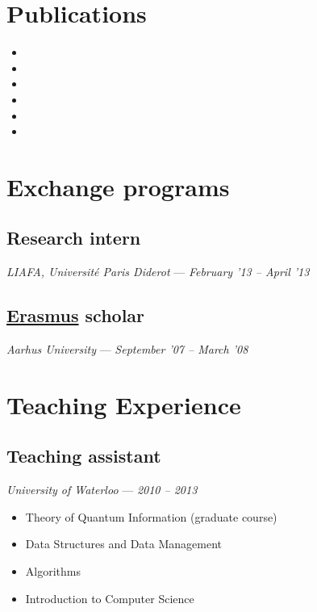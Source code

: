 \documentclass[]{article}
\begin{document}


\section{Publications}\label{publications}

\begin{itemize}
  \item {}
  \item {}
  \item {}
  \item {}
  \item {}
  \item {}
\end{itemize}

\section{Exchange programs}\label{exchange-programs}

\subsection{Research intern}\label{research-intern}

\emph{LIAFA, Université Paris Diderot} --- \emph{February '13 -- April
'13}

\subsection{\href{http://en.wikipedia.org/wiki/Erasmus_Programme}{Erasmus}
scholar}\label{erasmus-scholar}

\emph{Aarhus University} --- \emph{September '07 -- March '08}

\section{Teaching Experience}\label{teaching-experience}

\subsection{Teaching assistant}\label{teaching-assistant}

\emph{University of Waterloo} --- \emph{2010 -- 2013}

\begin{itemize}
\item Theory of Quantum Information (graduate course)
\item Data Structures and Data Management
\item Algorithms
\item Introduction to Computer Science
\end{itemize}
\end{document}
